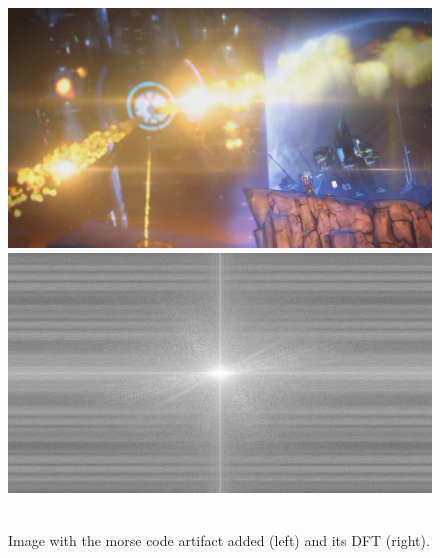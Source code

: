 \begin{figure}[H]
\centering
\includegraphics[scale=0.11]{images/experiment10.png}
\includegraphics[scale=0.11]{images/experiment11.png}\\\hspace{\fill}\\[-2ex]
\caption[Fourier transform on morse code artifact]{Image with the morse code artifact added (left) and its DFT (right).}
\label{fig:fourier2}
\end{figure}
